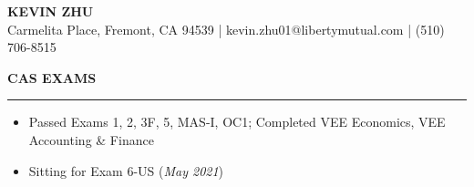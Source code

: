 \documentclass[11pt,letterpaper]{article}
\newcommand{\sectline}{\vspace{5pt}\hrule height 1.5pt\vspace{5pt}}
\newcommand{\sectspace}{\vspace{10pt}}
\begin{document}
\centering
{\fontsize{13pt}{13pt}\selectfont \textbf{KEVIN ZHU}} \vspace{2pt} \\
{\fontsize{11pt}{13pt} Carmelita Place, Fremont, CA 94539 | kevin.zhu01@libertymutual.com | (510) 706-8515}
\sectspace

\fontsize{11pt}{13pt}\selectfont
\raggedright
\textbf{CAS EXAMS}\sectline
\begin{itemize}
	\item Passed Exams 1, 2, 3F, 5, MAS-I, OC1; Completed VEE Economics, VEE Accounting \& Finance
	\item Sitting for Exam 6-US (\textit{May 2021})
\end{itemize}
\sectspace
\end{document}

